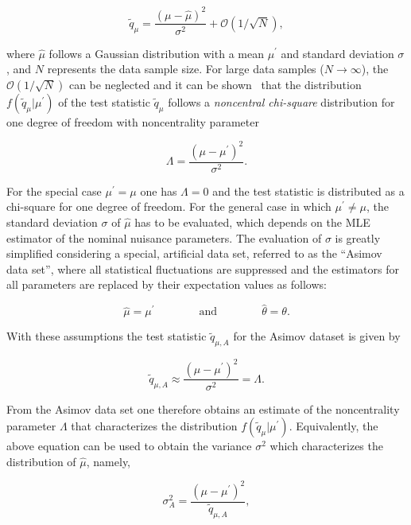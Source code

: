 \begin{equation}
\tilde{q}_\mu = \frac{(\mu-\hat{\mu})^2}{\sigma^2} + \mathcal{O}(1/\sqrt{N}),
\end{equation}

where $\hat{\mu}$ follows a Gaussian distribution with a mean $\mu^\prime$ and standard deviation $\sigma$, and $N$ represents the data sample size.
For large data samples ($N\rightarrow\infty$), the $\mathcal{O}(1/\sqrt{N})$ can be neglected and it can be shown~\cite{wilks1938} that the distribution $f(\tilde{q}_\mu|\mu^\prime)$ of the test statistic $\tilde{q}_\mu$
follows a \textit{noncentral chi-square} distribution for one degree of freedom with noncentrality parameter

\begin{equation}
\Lambda = \frac{(\mu-\mu^\prime)^2}{\sigma^2}.
\end{equation}

For the special case $\mu^\prime = \mu$ one has $\Lambda = 0$ and the test statistic is distributed as a chi-square for one degree of freedom.
For the general case in which $\mu^\prime \neq \mu$, the standard deviation $\sigma$ of $\hat{\mu}$ has to be evaluated, which depends on the MLE estimator of the nominal nuisance parameters.
The evaluation of $\sigma$ is greatly simplified considering a special, artificial data set, referred to as the ``Asimov data set'', where all statistical fluctuations are suppressed and the estimators for all parameters
are replaced by their expectation values as follows:

\begin{equation}
\hat{\mu} = \mu^\prime \qquad\qquad \mathrm{and} \qquad\qquad \hat{\theta} = \theta.
\end{equation}

With these assumptions the test statistic $\tilde{q}_{\mu,A}$ for the Asimov dataset is given by 

\begin{equation}
\tilde{q}_{\mu,A} \approx \frac{(\mu-\mu^\prime)^2}{\sigma^2} = \Lambda.
\end{equation}

From the Asimov data set one therefore obtains an estimate of the noncentrality parameter $\Lambda$ that characterizes the distribution $f(\tilde{q}_\mu|\mu^\prime)$.
Equivalently, the above equation can be used to obtain the variance $\sigma^2$ which characterizes the distribution of $\hat{\mu}$, namely,

\begin{equation}
\sigma_A^2 = \frac{(\mu-\mu^\prime)^2}{\tilde{q}_{\mu,A}},
\end{equation}

